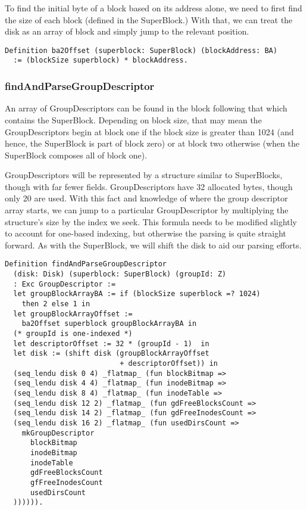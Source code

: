 \documentclass[nocopyrightspace]{sigplanconf}
\begin{document}
To find the initial byte of a block based on its address alone, we need to
first find the size of each block (defined in the SuperBlock.) With that, we
can treat the disk as an array of block and simply jump to the relevant
position.

\begin{lstlisting}
Definition ba2Offset (superblock: SuperBlock) (blockAddress: BA)
  := (blockSize superblock) * blockAddress.
\end{lstlisting}

\subsubsection{findAndParseGroupDescriptor}
An array of GroupDescriptors can be found in the block following that which
contains the SuperBlock. Depending on block size, that may mean the
GroupDescriptors begin at block one if the block size is greater than 1024
(and hence, the SuperBlock is part of block zero) or at block two otherwise
(when the SuperBlock composes all of block one). 

GroupDescriptors will be represented by a structure similar to SuperBlocks,
though with far fewer fields. GroupDescriptors have 32 allocated bytes, though
only 20 are used. With this fact and knowledge of where the group descriptor
array starts, we can jump to a particular GroupDescriptor by multiplying the
structure's size by the index we seek. This formula needs to be modified
slightly to account for one-based indexing, but otherwise the parsing is quite
straight forward. As with the SuperBlock, we will shift the disk to aid our
parsing efforts. 

\begin{lstlisting}
Definition findAndParseGroupDescriptor 
  (disk: Disk) (superblock: SuperBlock) (groupId: Z)
  : Exc GroupDescriptor :=
  let groupBlockArrayBA := if (blockSize superblock =? 1024)
    then 2 else 1 in
  let groupBlockArrayOffset := 
    ba2Offset superblock groupBlockArrayBA in
  (* groupId is one-indexed *)
  let descriptorOffset := 32 * (groupId - 1)  in
  let disk := (shift disk (groupBlockArrayOffset 
                           + descriptorOffset)) in
  (seq_lendu disk 0 4) _flatmap_ (fun blockBitmap =>
  (seq_lendu disk 4 4) _flatmap_ (fun inodeBitmap =>
  (seq_lendu disk 8 4) _flatmap_ (fun inodeTable =>
  (seq_lendu disk 12 2) _flatmap_ (fun gdFreeBlocksCount =>
  (seq_lendu disk 14 2) _flatmap_ (fun gdFreeInodesCount =>
  (seq_lendu disk 16 2) _flatmap_ (fun usedDirsCount =>
    mkGroupDescriptor
      blockBitmap
      inodeBitmap
      inodeTable
      gdFreeBlocksCount
      gfFreeInodesCount
      usedDirsCount
  )))))).
\end{lstlisting}
\end{document}
